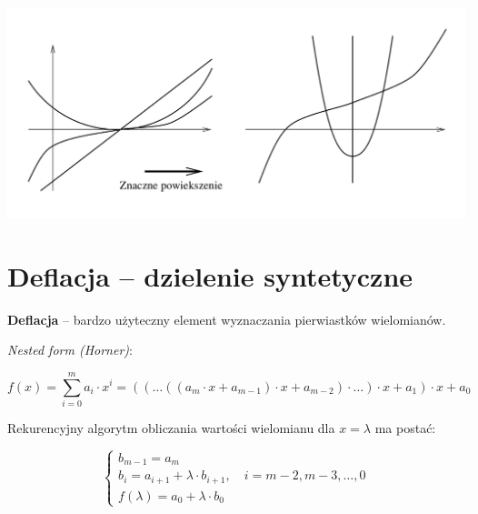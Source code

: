   \begin{frame}
    \includegraphics[width=\textwidth]{img/8/wielomian}
  \end{frame}

  \section{Deflacja -- dzielenie syntetyczne}

  \begin{frame}
    \textbf{Deflacja} -- bardzo użyteczny element wyznaczania pierwiastków wielomianów. %

    \textit{Nested form (Horner)}:

    $$ f(x) = \sum_{i=0}^m a_i \cdot x^i = ( ( \dots (( a_m \cdot x + a_{m-1}) \cdot x + a_{m-2} ) \cdot \dots) \cdot x + a_1) \cdot x + a_0 $$
  \end{frame}

  \begin{frame}
    Rekurencyjny algorytm obliczania wartości wielomianu dla $x = \lambda$ ma postać:

  $$ \left \{ \begin{array}{l}
  b_{m-1} = a_m \\
  b_i = a_{i+1} + \lambda \cdot b_{i+1}, \quad i = m - 2, m-3, \dots, 0 \\
  f( \lambda ) = a_{0} + \lambda \cdot b_{0}
  \end{array} \right. $$
  \end{frame}


